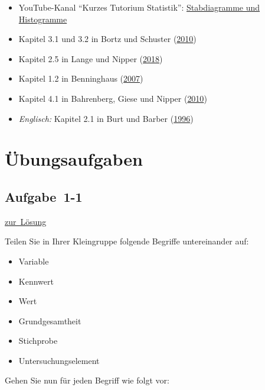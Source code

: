 \documentclass[
  11pt,
  ngerman,
  a4paper,
]{report}
\providecommand{\tightlist}{%
  \setlength{\itemsep}{0pt}\setlength{\parskip}{0pt}}
\begin{document}
\begin{itemize}
\tightlist
\item
  YouTube-Kanal \enquote{Kurzes Tutorium Statistik}: \href{https://www.youtube.com/watch?v=LkOBRWXnTRQ}{Stabdiagramme und Histogramme}
\item
  Kapitel 3.1 und 3.2 in Bortz und Schuster (\protect\hyperlink{ref-bortz}{2010})
\item
  Kapitel 2.5 in Lange und Nipper (\protect\hyperlink{ref-delange}{2018})
\item
  Kapitel 1.2 in Benninghaus (\protect\hyperlink{ref-benninghaus}{2007})
\item
  Kapitel 4.1 in Bahrenberg, Giese und Nipper (\protect\hyperlink{ref-bahrenberg}{2010})
\item
  \emph{Englisch:} Kapitel 2.1 in Burt und Barber (\protect\hyperlink{ref-burt}{1996})
\end{itemize}

\hypertarget{uxfcbungsaufgaben}{%
\section*{Übungsaufgaben}\label{uxfcbungsaufgaben}}

\hypertarget{aufgabe-1-1}{%
\subsection{Aufgabe~1-1}\label{aufgabe-1-1}}

\protect\hyperlink{loesung-1-1}{zur~Lösung}

Teilen Sie in Ihrer Kleingruppe folgende Begriffe untereinander auf:

\begin{itemize}
\tightlist
\item
  Variable
\item
  Kennwert
\item
  Wert
\item
  Grundgesamtheit
\item
  Stichprobe
\item
  Untersuchungselement
\end{itemize}

Gehen Sie nun für jeden Begriff wie folgt vor:
\end{document}
